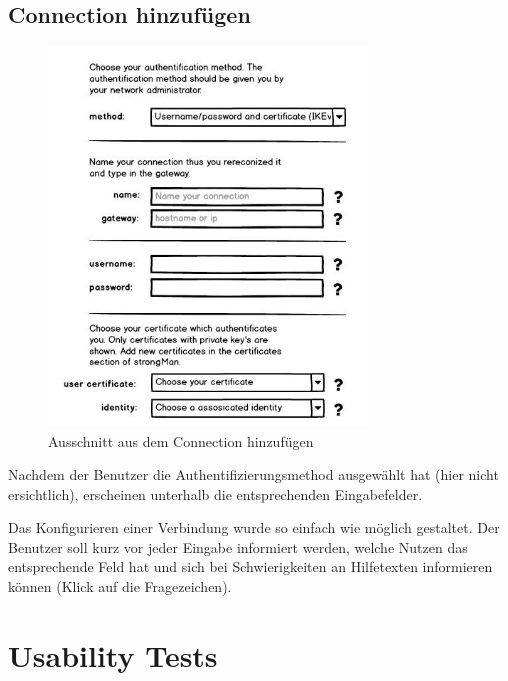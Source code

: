 \subsection{Connection hinzufügen}
\noindent\begin{minipage}{0.55\textwidth}
    \begin{figure}[H]
    	\centering
    	\includegraphics[width=240pt]{images/mockups/short_con_config.jpg}
    	\caption{Ausschnitt aus dem Connection hinzufügen}
    \end{figure}
\end{minipage}
\hfill
\begin{minipage}{0.45\textwidth}
Nachdem der Benutzer die Authentifizierungsmethod ausgewählt hat (hier nicht ersichtlich), erscheinen unterhalb die entsprechenden Eingabefelder.

Das Konfigurieren einer Verbindung wurde so einfach wie möglich gestaltet. Der Benutzer soll kurz vor jeder Eingabe informiert werden, welche Nutzen das entsprechende Feld hat und sich bei Schwierigkeiten an Hilfetexten informieren können (Klick auf die Fragezeichen).

\end{minipage}


\section{Usability Tests}